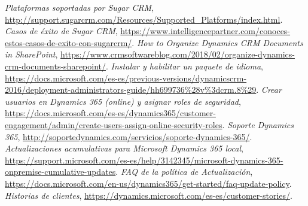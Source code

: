 \documentclass{article}
\begin{document}
\begin{thebibliography}{9}
 \textit{Plataformas soportadas por Sugar CRM}, \url{http://support.sugarcrm.com/Resources/Supported_Platforms/index.html}.
 \textit{Casos de éxito de Sugar CRM}, \url{https://www.intelligencepartner.com/conoces-estos-casos-de-exito-con-sugarcrm/}.
 \textit{How to Organize Dynamics CRM Documents in SharePoint}, \url{https://www.crmsoftwareblog.com/2018/02/organize-dynamics-crm-documents-sharepoint/}.
 \textit{Instalar y habilitar un paquete de idioma}, \url{https://docs.microsoft.com/es-es/previous-versions/dynamicscrm-2016/deployment-administrators-guide/hh699736\%28v\%3dcrm.8\%29}.
 \textit{Crear usuarios en Dynamics 365 (online) y asignar roles de seguridad}, \url{https://docs.microsoft.com/es-es/dynamics365/customer-engagement/admin/create-users-assign-online-security-roles}.
 \textit{Soporte Dynamics 365}, \url{http://soportedynamics.com/servicios/soporte-dynamics-365/}.
 \textit{Actualizaciones acumulativas para Microsoft Dynamics 365 local}, \url{https://support.microsoft.com/es-es/help/3142345/microsoft-dynamics-365-onpremise-cumulative-updates}.
 \textit{FAQ de la política de Actualización}, \url{https://docs.microsoft.com/en-us/dynamics365/get-started/faq-update-policy}.
 \textit{Historias de clientes}, \url{https://dynamics.microsoft.com/es-es/customer-stories/}.

\end{thebibliography}
\end{document}
